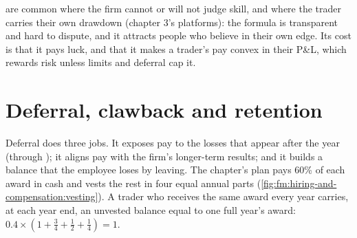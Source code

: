 \label{lst:fm:hiring-and-compensation:shrink}

\begin{omfigure}

\label{fig:fm:hiring-and-compensation:scatter}
\end{omfigure}

\begin{remark}\label{rem:fm:hiring-and-compensation:why}
 are common where the firm cannot or will not judge skill, and where the trader carries their own drawdown (chapter 3's
platforms): the formula is transparent and hard to dispute, and it attracts people who believe in their own edge. Its cost is that it pays luck, and
that it makes a trader's pay convex in their P\&L, which rewards risk unless limits and deferral cap it.
\end{remark}

\section{Deferral, clawback and retention}

Deferral does three jobs. It exposes pay to the losses that appear after the year (through ); it aligns pay with the firm's longer-term
results; and it builds a balance that the employee loses by leaving. The chapter's plan pays 60\% of each award in cash and vests the rest in four
equal annual parts (\cref{fig:fm:hiring-and-compensation:vesting}). A trader who receives the same award every year carries, at each year end, an
unvested balance equal to one full year's award: $0.4\times(1+\tfrac34+\tfrac12+\tfrac14)=1$.

